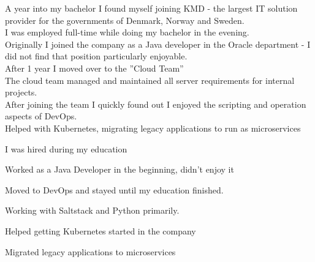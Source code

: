 \documentclass[]{cv}
\begin{document}
\begin{minipage}[t]{0.66\textwidth}
A year into my bachelor I found myself joining KMD - the largest IT solution provider for the governments of Denmark, Norway and Sweden. \\
I was employed full-time while doing my bachelor in the evening. \\
Originally I joined the company as a Java developer in the Oracle department - I did not find that position particularly enjoyable. \\
After 1 year I moved over to the ”Cloud Team” \\
The cloud team managed and maintained all server requirements for internal projects. \\
After joining the team I quickly found out I enjoyed the scripting and operation aspects of DevOps. \\
Helped with Kubernetes, migrating legacy applications to run as microservices

\begin{tightemize}
	\item I was hired during my education
	\item Worked as a Java Developer in the beginning, didn’t enjoy it
	\item Moved to DevOps and stayed until my education finished.
	\item Working with Saltstack and Python primarily.
	\item Helped getting Kubernetes started in the company
    \item Migrated legacy applications to microservices
\end{tightemize}
\sectionsep

\end{minipage} 
\end{document}
